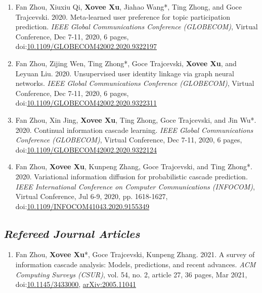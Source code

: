 \documentclass{article}
\begin{document}
\begin{enumerate}
    \item Fan Zhou, Xiuxiu Qi, \textbf{Xovee Xu}, Jiahao Wang*, Ting Zhong, and Goce Trajcevski. 2020. Meta-learned user preference for topic participation prediction. \textit{IEEE Global Communications Conference (GLOBECOM)}, Virtual Conference, Dec 7-11, 2020, 6 pages, doi:\href{https://doi.org/10.1109/GLOBECOM42002.2020.9322197}{10.1109/GLOBECOM42002.2020.9322197}
    \item Fan Zhou, Zijing Wen, Ting Zhong*, Goce Trajcevski, \textbf{Xovee Xu}, and Leyuan Liu. 2020. Unsupervised user identity linkage via graph neural networks. \textit{IEEE Global Communications Conference (GLOBECOM)}, Virtual Conference, Dec 7-11, 2020, 6 pages, doi:\href{https://doi.org/10.1109/GLOBECOM42002.2020.9322311}{10.1109/GLOBECOM42002.2020.9322311}
    \item Fan Zhou, Xin Jing, \textbf{Xovee Xu}, Ting Zhong, Goce Trajcevski, and Jin Wu*. 2020. Continual information cascade learning. \textit{IEEE Global Communications Conference (GLOBECOM)}, Virtual Conference, Dec 7-11, 2020, 6 pages, doi:\href{https://doi.org/10.1109/GLOBECOM42002.2020.9322124}{10.1109/GLOBECOM42002.2020.9322124}
    \item Fan Zhou, \textbf{Xovee Xu}, Kunpeng Zhang, Goce Trajcevski, and Ting Zhong*. 2020. Variational information diffusion for probabilistic cascade prediction. \textit{IEEE International Conference on Computer Communications (INFOCOM)}, Virtual Conference, Jul 6-9, 2020, pp. 1618-1627, doi:\href{https://doi.org/10.1109/INFOCOM41043.2020.9155349}{10.1109/INFOCOM41043.2020.9155349}
\end{enumerate}

\subsection*{\textnormal{\textit{Refereed Journal Articles}}}

\begin{enumerate}[resume]
    \item Fan Zhou, \textbf{Xovee Xu}*, Goce Trajcevski, Kunpeng Zhang. 2021. A survey of information cascade analysis: Models, predictions, and recent advances. \textit{ACM Computing Surveys (CSUR)}, vol. 54, no. 2, article 27, 36 pages, Mar 2021, doi:\href{https://xovee.cn/html/paper-redirects/csur2021.html}{10.1145/3433000}, \href{https://arxiv.org/abs/2005.11041}{arXiv:2005.11041}
\end{enumerate}
\end{document}

